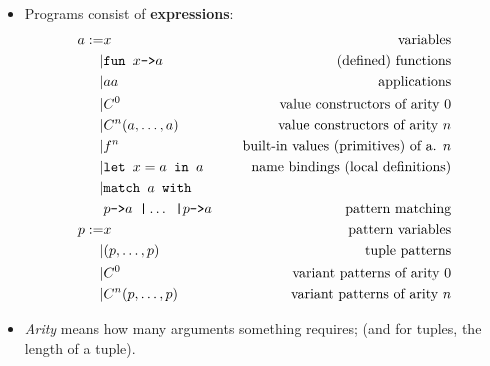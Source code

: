 \documentclass{beamer}
\newcommand{\assign}{:=}
\newcommand{\tmem}[1]{{\em #1\/}}
\newcommand{\tmstrong}[1]{\textbf{#1}}
\newcommand{\tmverbatim}[1]{\text{{\ttfamily{#1}}}}
\begin{document}
\begin{itemize}
  \item Programs consist of {\tmstrong{expressions}}:
  \begin{eqnarray*}
    a \assign & x & \text{variables}\\
    | & \text{\tmverbatim{fun }} x \text{\tmverbatim{->}} a & \text{(defined)
    functions}\\
    | & a a & \text{applications}\\
    | & C^0 & \text{value constructors of arity } 0\\
    | & C^n (a, \ldots, a) & \text{value constructors of arity } n\\
    | & f^n & \text{built-in values (primitives) of a. } n\\
    | & \text{\tmverbatim{let }} x = a \text{\tmverbatim{ in }} a & \text{name
    bindings (local definitions)}\\
    | & \text{\tmverbatim{match }} a \text{\tmverbatim{ with} \ \ \ \ \ \ \ }
    & \\
    & p \text{\tmverbatim{->}} a \text{\tmverbatim{ \textbar }} \ldots
    \text{\tmverbatim{ \textbar }} p \text{\tmverbatim{->}} a & \text{pattern
    matching}\\
    p \assign & x & \text{pattern variables}\\
    | & (p, \ldots, p) & \text{tuple patterns}\\
    | & C^0 & \text{variant patterns of arity } 0\\
    | & C^n (p, \ldots, p) & \text{variant patterns of arity } n
  \end{eqnarray*}
  \item {\tmem{Arity}} means how many arguments something requires; (and for
  tuples, the length of a tuple).
  

\end{itemize}
\end{document}
